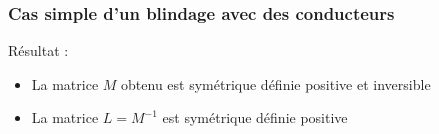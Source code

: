 \begin{frame}
\frametitle{Cas simple d'un blindage avec des conducteurs}
R\'esultat : \\[1cm]
\begin{itemize}
\item La matrice $M$ obtenu est sym\'etrique d\'efinie positive et inversible \\[1cm]
\item La matrice $L = M^{-1}$ est sym\'etrique d\'efinie positive
\end{itemize}



\end{frame} 


